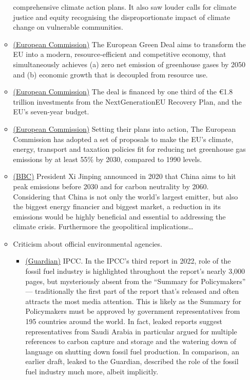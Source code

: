 \documentclass[oneside]{book}
\begin{document}
\begin{enumerate}
\begin{itemize}
            comprehensive climate action plans. It also saw louder calls for climate justice and equity recognising the disproportionate impact of climate change on vulnerable communities.
            \item \href{https://commission.europa.eu/ipccstrategy-and-policy/priorities-2019-2024/european-green-deal_en}{(European Commission)} The European Green Deal aims to transform the EU into a modern, resource-efficient and competitive economy, that simultaneously achieves (a) zero net emission of greenhouse gases by 2050 and (b) economic growth that is decoupled from resource use. 
            \item \href{https://commission.europa.eu/strategy-and-policy/priorities-2019-2024/european-green-deal_en}{(European Commission)} The deal is financed by one third of the €1.8 trillion investments from the NextGenerationEU Recovery Plan, and the EU's seven-year budget.
            \item \href{https://commission.europa.eu/strategy-and-policy/priorities-2019-2024/european-green-deal_en}{(European Commission)} Setting their plans into action, The European Commission has adopted a set of proposals to make the EU's climate, energy, transport and taxation policies fit for reducing net greenhouse gas emissions by at least 55\% by 2030, compared to 1990 levels.
            \item \href{https://www.bbc.com/news/science-environment-54256826}{(BBC)} President Xi Jinping announced in 2020 that China aims to hit peak emissions before 2030 and for carbon neutrality by 2060. Considering that China is not only the world's largest emitter, but also the biggest energy financier and biggest market, a reduction in its emissions would be highly beneficial and essential to addressing the climate crisis. Furthermore the geopolitical implications\dots
            \item Criticism about official environmental agencies.
            \begin{itemize}
                \item \href{https://www.theguardian.com/environment/2022/apr/05/ipcc-report-scientists-climate-crisis-fossil-fuels}{(Guardian)} IPCC. In the IPCC's third report in 2022, role of the fossil fuel industry is highlighted throughout the report's nearly 3,000 pages, but mysteriously absent from the ``Summary for Policymakers'' --- traditionally the first part of the report that's released and often attracts the most media attention. This is likely as the Summary for Policymakers must be approved by government representatives from 195 countries around the world. In fact, leaked reports suggest representatives from Saudi Arabia in particular argued for multiple references to carbon capture and storage and the watering down of language on shutting down fossil fuel production. In comparison, an earlier draft, leaked to the Guardian, described the role of the fossil fuel industry much more, albeit implicitly. 

\end{itemize}
\end{itemize}
\end{enumerate}
\end{document}
